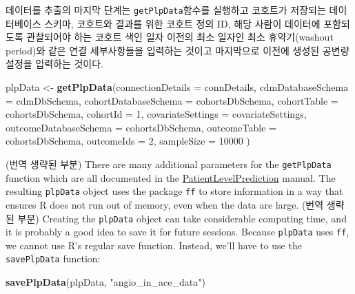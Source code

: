\documentclass[11pt]{book}
\newenvironment{Shaded}{\begin{snugshade}}{\end{snugshade}}
\newcommand{\KeywordTok}[1]{\textcolor[rgb]{0.13,0.29,0.53}{\textbf{#1}}}
\newcommand{\DataTypeTok}[1]{\textcolor[rgb]{0.13,0.29,0.53}{#1}}
\newcommand{\DecValTok}[1]{\textcolor[rgb]{0.00,0.00,0.81}{#1}}
\newcommand{\StringTok}[1]{\textcolor[rgb]{0.31,0.60,0.02}{#1}}
\newcommand{\NormalTok}[1]{#1}
\theoremstyle{definition}
\theoremstyle{definition}
\theoremstyle{definition}
\theoremstyle{remark}
\begin{document}
데이터를 추출의 마지막 단계는 \texttt{getPlpData}함수를 실행하고
코호트가 저장되는 데이터베이스 스키마, 코호트와 결과를 위한 코호트 정의
ID, 해당 사람이 데이터에 포함되도록 관찰되어야 하는 코호트 색인 일자
이전의 최소 일자인 최소 휴약기(washout period)와 같은 연결 세부사항들을
입력하는 것이고 마지막으로 이전에 생성된 공변량 설정을 입력하는 것이다.

\begin{Shaded}
\begin{Highlighting}[]
\NormalTok{plpData <-}\StringTok{ }\KeywordTok{getPlpData}\NormalTok{(}\DataTypeTok{connectionDetails =}\NormalTok{ connDetails,}
                      \DataTypeTok{cdmDatabaseSchema =}\NormalTok{ cdmDbSchema,}
                      \DataTypeTok{cohortDatabaseSchema =}\NormalTok{ cohortsDbSchema,}
                      \DataTypeTok{cohortTable =}\NormalTok{ cohortsDbSchema,}
                      \DataTypeTok{cohortId =} \DecValTok{1}\NormalTok{,}
                      \DataTypeTok{covariateSettings =}\NormalTok{ covariateSettings,}
                      \DataTypeTok{outcomeDatabaseSchema =}\NormalTok{ cohortsDbSchema,}
                      \DataTypeTok{outcomeTable =}\NormalTok{ cohortsDbSchema,}
                      \DataTypeTok{outcomeIds =} \DecValTok{2}\NormalTok{,}
                      \DataTypeTok{sampleSize =} \DecValTok{10000}
\NormalTok{)}
\end{Highlighting}
\end{Shaded}

(번역 생략된 부분) There are many additional parameters for the
\texttt{getPlpData} function which are all documented in the
\href{https://ohdsi.github.io/PatientLevelPrediction/}{PatientLevelPrediction}
manual. The resulting \texttt{plpData} object uses the package
\texttt{ff} to store information in a way that ensures R does not run
out of memory, even when the data are large. (번역 생략된 부분) Creating
the \texttt{plpData} object can take considerable computing time, and it
is probably a good idea to save it for future sessions. Because
\texttt{plpData} uses \texttt{ff}, we cannot use R's regular save
function. Instead, we'll have to use the \texttt{savePlpData} function:

\begin{Shaded}
\begin{Highlighting}[]
\KeywordTok{savePlpData}\NormalTok{(plpData, }\StringTok{"angio_in_ace_data"}\NormalTok{)}
\end{Highlighting}
\end{Shaded}
\end{document}
